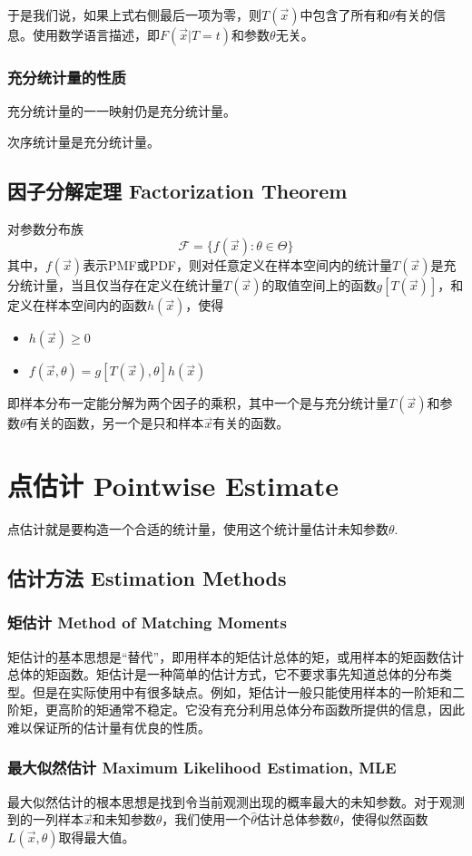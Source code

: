 \documentclass[UTF8]{ctexbook}
\begin{document}
于是我们说，如果上式右侧最后一项为零，则$T(\vec x)$中包含了所有和$\theta$有关的信息。使用数学语言描述，即$F(\vec x|T=t)$和参数$\theta$无关。
\subsection{充分统计量的性质}
充分统计量的一一映射仍是充分统计量。

次序统计量是充分统计量。
\section{因子分解定理 Factorization Theorem}
对参数分布族
\[
	\mathcal{F}=\{f(\vec x):\theta\in\Theta\}
\]
其中，$f(\vec x)$表示PMF或PDF，则对任意定义在样本空间内的统计量$T(\vec x)$是充分统计量，当且仅当存在定义在统计量$T(\vec x)$的取值空间上的函数$g[T(\vec x)]$，和定义在样本空间内的函数$h(\vec x)$，使得
\begin{itemize}
	\item $h(\vec x)\geq 0$
	\item $f(\vec x,\theta)=g[T(\vec x),\theta]h(\vec x)$
\end{itemize}

即样本分布一定能分解为两个因子的乘积，其中一个是与充分统计量$T(\vec x)$和参数$\theta$有关的函数，另一个是只和样本$\vec x$有关的函数。
\chapter{点估计 Pointwise Estimate}
点估计就是要构造一个合适的统计量，使用这个统计量估计未知参数$\theta$.
\section{估计方法 Estimation Methods}
\subsection{矩估计 Method of Matching Moments}
矩估计的基本思想是“替代”，即用样本的矩估计总体的矩，或用样本的矩函数估计总体的矩函数。矩估计是一种简单的估计方式，它不要求事先知道总体的分布类型。但是在实际使用中有很多缺点。例如，矩估计一般只能使用样本的一阶矩和二阶矩，更高阶的矩通常不稳定。它没有充分利用总体分布函数所提供的信息，因此难以保证所的估计量有优良的性质。
\subsection{最大似然估计 Maximum Likelihood Estimation, MLE}
最大似然估计的根本思想是找到令当前观测出现的概率最大的未知参数。对于观测到的一列样本$\vec x$和未知参数$\theta$，我们使用一个$\hat\theta$估计总体参数$\theta$，使得似然函数$L(\vec x,\theta)$取得最大值。
\end{document}
